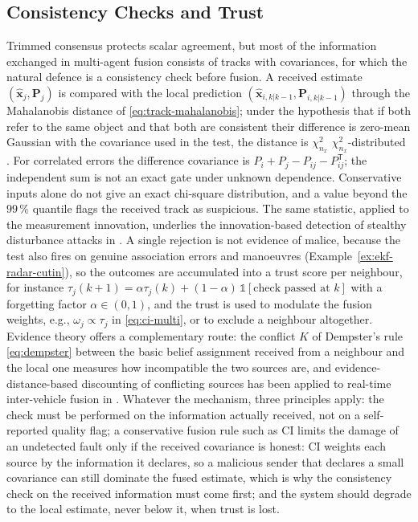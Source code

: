 \documentclass[graybox,envcountchap]{style/SNmono}
\providecommand{\DIFadd}[1]{{\protect\color{blue} #1}} %
\providecommand{\DIFdel}[1]{{\protect\color{red} #1}} %
\providecommand{\DIFaddbegin}{} %
\providecommand{\DIFaddend}{} %
\providecommand{\DIFdelbegin}{} %
\providecommand{\DIFdelend}{} %
\begin{document}
\subsection{Consistency Checks and Trust}
\label{subsec:mas-trust}

Trimmed consensus protects scalar agreement, but most of the information exchanged in multi-agent fusion consists of tracks with covariances, for which the natural defence is a consistency check before fusion. A received estimate $(\widehat{\mathbf{x}}_j,\mathbf{P}_j)$ is compared with the local prediction $(\widehat{\mathbf{x}}_{i,k|k-1},\mathbf{P}_{i,k|k-1})$ through the Mahalanobis distance of \eqref{eq:track-mahalanobis}; \DIFdelbegin \DIFdel{under the hypothesis that }\DIFdelend \DIFaddbegin \DIFadd{if }\DIFaddend both refer to the same object and \DIFdelbegin \DIFdel{that both are consistent}\DIFdelend \DIFaddbegin \DIFadd{their difference is zero-mean Gaussian with the covariance used in the test}\DIFaddend , the distance is \DIFdelbegin \DIFdel{$\chi^{2}_{n_x}$}\DIFdelend \DIFaddbegin \DIFadd{$\chi^2_{n_x}$}\DIFaddend -distributed\DIFaddbegin \DIFadd{. For correlated errors the difference covariance is $P_i+P_j-P_{ij}-P_{ij}^{\mathsf T}$; the independent sum is not an exact gate under unknown dependence. Conservative inputs alone do not give an exact chi-square distribution}\DIFaddend , and a value beyond the $99\,\%$ quantile flags the received track as suspicious. The same statistic, applied to the measurement innovation, underlies the innovation-based detection of stealthy disturbance attacks in \cite{oliva_innovation_2026}. A single rejection is not evidence of malice, because the test also fires on genuine association errors and manoeuvres (Example~\ref{ex:ekf-radar-cutin}), so the outcomes are accumulated into a trust score per neighbour, for instance $\tau_j(k+1)=\alpha\tau_j(k)+(1-\alpha)\,\mathbb{1}[\text{check passed at }k]$ with a forgetting factor $\alpha\in(0,1)$, and the trust is used to modulate the fusion weights, e.g., $\omega_j\propto\tau_j$ in \eqref{eq:ci-multi}, or to exclude a neighbour altogether. Evidence theory offers a complementary route: the conflict $K$ of Dempster's rule \eqref{eq:dempster} between the basic belief assignment received from a neighbour and the local one measures how incompatible the two sources are, and evidence-distance-based discounting of conflicting sources has been applied to real-time inter-vehicle fusion in \cite{cho_realtime_2020}. Whatever the mechanism, three principles apply: the check must be performed on the information actually received, not on a self-reported quality flag; a conservative fusion rule such as CI limits the damage of an undetected fault only if the received covariance is honest: CI weights each source by the information it declares, so a malicious sender that declares a small covariance can still dominate the fused estimate, which is why the consistency check on the received information must come first; and the system should degrade to the local estimate, never below it, when trust is lost.
\end{document}
